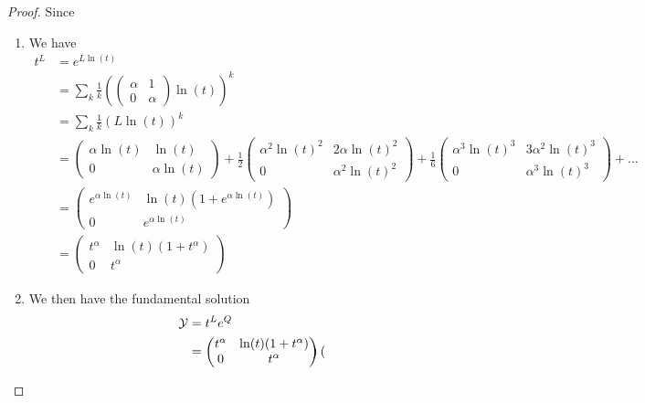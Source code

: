 \begin{proof}
  Since
  \begin{enumerate}
    \item We have
      \begin{align*}
        t^L&=e^{L\ln(t)}
        \\&=\sum_k\frac{1}{k}\left(\begin{pmatrix}
            \alpha & 1 \\ 0 & \alpha
           \end{pmatrix}\ln(t)\right)^k
        \\&=\sum_k\frac{1}{k}\left(L\ln(t)\right)^k
        \\&=
          \begin{pmatrix}
            \alpha\ln(t) & \ln(t) \\ 0 & \alpha\ln(t)
          \end{pmatrix}
          +
          \frac{1}{2}\begin{pmatrix}
            \alpha^2\ln(t)^2 & 2\alpha\ln(t)^2 \\ 0 & \alpha^2\ln(t)^2
          \end{pmatrix}
          +
          \frac{1}{6}\begin{pmatrix}
            \alpha^3\ln(t)^3 & 3\alpha^2\ln(t)^3 \\ 0 & \alpha^3\ln(t)^3
          \end{pmatrix}
          +\dots
        \\&=
          \begin{pmatrix}
            e^{\alpha\ln(t)} & \ln(t)(1+e^{\alpha\ln(t)}) \\ 0 & e^{\alpha\ln(t)}
          \end{pmatrix}
        \\&=
          \begin{pmatrix}
            t^\alpha & \ln(t)(1+t^\alpha) \\ 0 & t^\alpha
          \end{pmatrix}
      \end{align*}
    \item We then have the fundamental solution
      \begin{align*}
        \mathcal{Y}&=t^Le^Q
        \\&=\begin{pmatrix}
          t^\alpha & \ln(t)(1+t^\alpha) \\ 0 & t^\alpha
        \end{pmatrix}
        \begin{pmatrix}

\end{pmatrix}
\end{align*}
\end{enumerate}
\end{proof}
